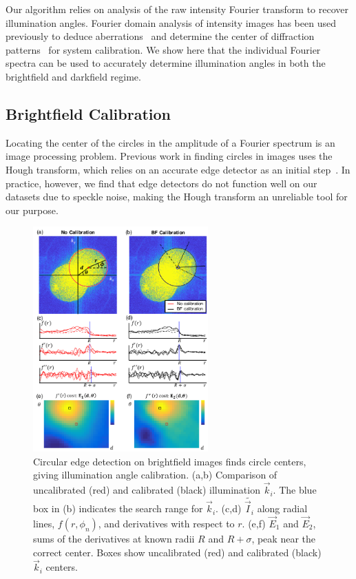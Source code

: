 Our algorithm relies on analysis of the raw intensity Fourier transform to recover illumination angles. Fourier domain analysis of intensity images has been used previously to deduce aberrations~\cite{Shanker:16} and determine the center of diffraction patterns~\cite{DAMMER1997214,CAUCHIE2008567} for system calibration. We show here that the individual Fourier spectra can be used to accurately determine illumination angles in both the brightfield and darkfield regime.

\subsection{Brightfield Calibration}
Locating the center of the circles in the amplitude of a Fourier spectrum is an image processing problem. Previous work in finding circles in images uses the Hough transform, which relies on an accurate edge detector as an initial step~\cite{Yuen89,Davies:04}. In practice, however, we find that edge detectors do not function well on our datasets due to speckle noise, making the Hough transform an unreliable tool for our purpose.

\begin{figure} [tb]
	\centering
	\includegraphics[width=0.6\textwidth]{figures/fig_selfcal_fpm_bf.pdf}
	\caption{Circular edge detection on brightfield images finds circle centers, giving illumination angle calibration. (a,b) Comparison of uncalibrated (red) and calibrated (black) illumination $\vec{k}_i$. The blue box in (b) indicates the search range for $\vec{k}_i$. (c,d) $\tilde{\vec{I}_i}$ along radial lines, $f(r,\phi_n)$, and derivatives with respect to $r$. (e,f) $\vec{E}_1$ and $\vec{E}_2$, sums of the derivatives at known radii $R$ and $R+\sigma$, peak near the correct center. Boxes show uncalibrated (red) and calibrated (black) $\vec{k}_i$ centers.
		}
	\label{fig:BF_calibration}
\end{figure}

